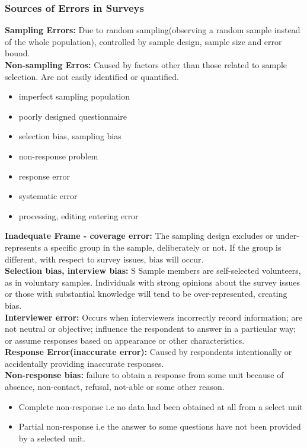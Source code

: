 \documentclass{article}
\theoremstyle{definition}
\theoremstyle{thrm}
\theoremstyle{lma}
\theoremstyle{ppst}
\theoremstyle{crlr}
\begin{document}
\subsubsection{Sources of Errors in Surveys}
\textbf{Sampling Errors:} Due to random sampling(observing a random sample instead of the whole population), controlled by sample design, sample size and error bound. \\
\textbf{Non-sampling Erros:} Caused by factors other than those related to sample selection. Are not easily identified or quantified.
\begin{itemize}
	\item imperfect sampling population
	\item poorly designed questionnaire
	\item selection bias, sampling bias
	\item non-response problem
	\item response error
	\item systematic error
	\item processing, editing entering error
\end{itemize}
\textbf{Inadequate Frame - coverage error: }The sampling design excludes or under-represents a specific group in the sample, deliberately or not. If the group is different, with respect to survey issues, bias will occur. \\
\textbf{Selection bias, interview bias: }S Sample members are self-selected volunteers, as in voluntary samples. Individuals with strong opinions about the survey issues or those with substantial knowledge will tend to be over-represented, creating bias.\\
\textbf{Interviewer error: } Occurs when interviewers incorrectly record information; are not neutral or objective; influence the respondent to answer in a particular way; or assume responses based on appearance or other characteristics.\\
\textbf{Response Error(inaccurate error): }Caused by respondents intentionally or accidentally providing inaccurate responses. \\
\textbf{Non-response bias: } failure to obtain a response from some unit because of absence, non-contact, refusal, not-able or some other reason.
\begin{itemize}
	\item Complete non-response i.e no data had been obtained at all from a select unit
	\item Partial non-response i.e the answer to some questions have not been provided by a selected unit.
\end{itemize} 
\end{document}
